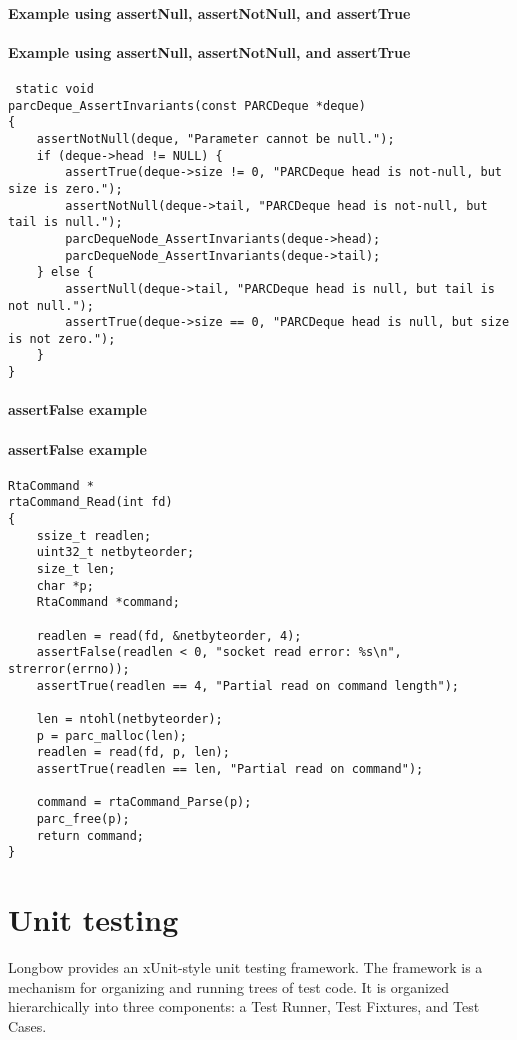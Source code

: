 \documentclass[12pt]{article} %
\begin{document}
\paragraph {Example using assertNull, assertNotNull, and assertTrue}
 \paragraph {Example using assertNull, assertNotNull, and assertTrue}
 
 \begin{lstlisting}
 static void
parcDeque_AssertInvariants(const PARCDeque *deque)
{
    assertNotNull(deque, "Parameter cannot be null.");
    if (deque->head != NULL) {
        assertTrue(deque->size != 0, "PARCDeque head is not-null, but size is zero.");
        assertNotNull(deque->tail, "PARCDeque head is not-null, but tail is null.");
        parcDequeNode_AssertInvariants(deque->head);
        parcDequeNode_AssertInvariants(deque->tail);
    } else {
        assertNull(deque->tail, "PARCDeque head is null, but tail is not null.");
        assertTrue(deque->size == 0, "PARCDeque head is null, but size is not zero.");
    }
}

\end{lstlisting}

\paragraph {assertFalse example}
\paragraph {assertFalse example}
 \begin{lstlisting}
RtaCommand *
rtaCommand_Read(int fd)
{
    ssize_t readlen;
    uint32_t netbyteorder;
    size_t len;
    char *p;
    RtaCommand *command;

    readlen = read(fd, &netbyteorder, 4);
    assertFalse(readlen < 0, "socket read error: %s\n", strerror(errno));
    assertTrue(readlen == 4, "Partial read on command length");

    len = ntohl(netbyteorder);
    p = parc_malloc(len);
    readlen = read(fd, p, len);
    assertTrue(readlen == len, "Partial read on command");

    command = rtaCommand_Parse(p);
    parc_free(p);
    return command;
}
\end{lstlisting}


\section{Unit testing}  
Longbow provides an xUnit-style unit testing framework. The framework is a mechanism for organizing and running trees of test code. It is organized hierarchically into three components: a Test Runner, Test Fixtures, and Test Cases.
\end{document}
